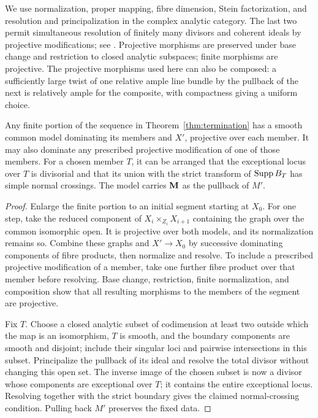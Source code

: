 We use normalization, proper mapping, fibre dimension, Stein
factorization, and resolution and principalization in the complex
analytic category. The last two permit simultaneous resolution
of finitely many divisors and coherent ideals by projective
modifications; see
\cite[Theorems~1.6, 1.10, and~13.2(1)]{BierstoneMilman1997}.
Projective morphisms are preserved under base change and
restriction to closed analytic subspaces; finite morphisms are
projective. The projective morphisms used here can also be
composed: a sufficiently large twist of one relative ample
line bundle by the pullback of the next is relatively ample
for the composite, with compactness giving a uniform choice.

\begin{proposition}\label{prop:common-models}
Any finite portion of the sequence in
Theorem~\ref{thm:termination} has a smooth common model dominating
its members and $X'$, projective over each member. It may also
dominate any prescribed projective modification of one of those
members. For a chosen member $T$, it can be arranged that the
exceptional locus over $T$ is divisorial and that its union with
the strict transform of $\operatorname{Supp} B_T$ has simple normal crossings.
The model carries $\mathbf M$ as the pullback of $M'$.
\end{proposition}

\begin{proof}
Enlarge the finite portion to an initial segment starting at $X_0$.
For one step, take the reduced component of
$X_i\times_{Z_i}X_{i+1}$ containing the graph over the common
isomorphic open. It is projective over both models, and its
normalization remains so. Combine these graphs and $X'\to X_0$
by successive dominating components of fibre products, then
normalize and resolve. To include a prescribed projective
modification of a member, take one further fibre product over
that member before resolving. Base change, restriction, finite
normalization, and composition show that all resulting morphisms
to the members of the segment are projective.

Fix $T$. Choose a closed analytic subset of codimension at
least two outside which the map is an isomorphism, $T$ is
smooth, and the boundary components are smooth and disjoint;
include their singular loci and pairwise intersections in this
subset. Principalize the pullback of its ideal and resolve
the total divisor without changing this open set. The inverse
image of the chosen subset is now a divisor whose components
are exceptional over $T$; it contains the entire exceptional
locus. Resolving together with the strict boundary gives the
claimed normal-crossing condition. Pulling back $M'$ preserves
the fixed data.
\end{proof}


